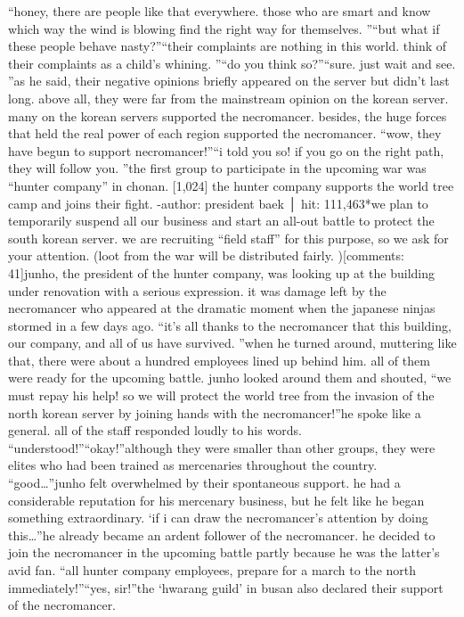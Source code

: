 “honey, there are people like that everywhere.
 those who are smart and know which way the wind is blowing find the right way for themselves.
”“but what if these people behave nasty?”“their complaints are nothing in this world.
 think of their complaints as a child’s whining.
”“do you think so?”“sure.
 just wait and see.
”as he said, their negative opinions briefly appeared on the server but didn’t last long.
 above all, they were far from the mainstream opinion on the korean server.
many on the korean servers supported the necromancer.
 besides, the huge forces that held the real power of each region supported the necromancer.
“wow, they have begun to support necromancer!”“i told you so! if you go on the right path, they will follow you.
”the first group to participate in the upcoming war was “hunter company” in chonan.
[1,024] the hunter company supports the world tree camp and joins their fight.
-author: president baek │ hit: 111,463*we plan to temporarily suspend all our business and start an all-out battle to protect the south korean server.
 we are recruiting “field staff” for this purpose, so we ask for your attention.
 (loot from the war will be distributed fairly.
)[comments: 41]junho, the president of the hunter company, was looking up at the building under renovation with a serious expression.
 it was damage left by the necromancer who appeared at the dramatic moment when the japanese ninjas stormed in a few days ago.
“it’s all thanks to the necromancer that this building, our company, and all of us have survived.
”when he turned around, muttering like that, there were about a hundred employees lined up behind him.
 all of them were ready for the upcoming battle.
junho looked around them and shouted, “we must repay his help! so we will protect the world tree from the invasion of the north korean server by joining hands with the necromancer!”he spoke like a general.
 all of the staff responded loudly to his words.
“understood!”“okay!”although they were smaller than other groups, they were elites who had been trained as mercenaries throughout the country.
“good…”junho felt overwhelmed by their spontaneous support.
 he had a considerable reputation for his mercenary business, but he felt like he began something extraordinary.
‘if i can draw the necromancer’s attention by doing this…”he already became an ardent follower of the necromancer.
he decided to join the necromancer in the upcoming battle partly because he was the latter’s avid fan.
“all hunter company employees, prepare for a march to the north immediately!”“yes, sir!”the ‘hwarang guild’ in busan also declared their support of the necromancer.


